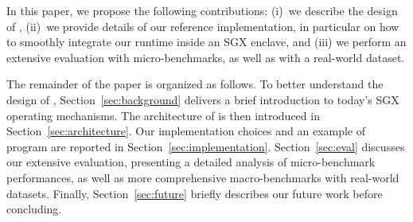 
In this paper, we propose the following contributions: (i)~we describe the design of \SYS, (ii)~we provide details of our reference implementation, in particular on how to smoothly integrate our runtime inside an SGX enclave, and (iii) we perform an extensive evaluation with micro-benchmarks, as well as with a real-world dataset.

The remainder of the paper is organized as follows.
To better understand the design of \SYS, Section~\ref{sec:background} delivers a brief introduction to today's SGX operating mechanisms.
The architecture of \SYS{} is then introduced in Section~\ref{sec:architecture}.
Our implementation choices and an example of \SYS{} program are reported in Section~\ref{sec:implementation}.
Section~\ref{sec:eval} discusses our extensive evaluation, presenting a detailed analysis of micro-benchmark performances, as well as more comprehensive macro-benchmarks with real-world datasets.
Finally, Section~\ref{sec:future} briefly describes our future work before concluding.
